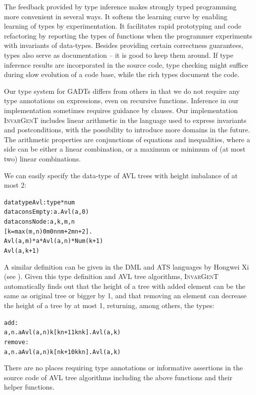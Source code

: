 \documentclass{article}
\newcommand{\tmname}[1]{\textsc{#1}}
\newcommand{\tmverbatim}[1]{{\ttfamily{#1}}}
\newenvironment{tmcode}[1][]{\begin{alltt}}{\end{alltt}}
\begin{document}
The feedback provided by type inference makes strongly typed programming more
convenient in several ways. It softens the learning curve by enabling learning
of types by experimentation. It facilitates rapid prototyping and code
refactoring by reporting the types of functions when the programmer
experiments with invariants of data-types. Besides providing certain
correctness guarantees, types also serve as documentation -- it is good to
keep them around. If type inference results are incorporated in the source
code, type checking might suffice during slow evolution of a code base, while
the rich types document the code.

Our type system for GADTs differs from others in that we do not require any
type annotations on expressions, even on recursive functions. Inference in our
implementation sometimes requires guidance by \tmverbatim{assert} clauses. Our
implementation {\tmname{InvarGenT}} includes linear arithmetic in the language
used to express invariants and postconditions, with the possibility to
introduce more domains in the future. The arithmetic properties are
conjunctions of equations and inequalities, where a side can be either a
linear combination, or a maximum or minimum of (at most two) linear
combinations.

\begin{example}
  We can easily specify the data-type of AVL trees with height imbalance of at
  most 2:
  \begin{tmcode}
  datatype Avl : type * num
datacons Empty : a. Avl (a, 0)
datacons Node : a,k,m,n
  [k=max(m,n)  0m  0n  nm+2  mn+2].
     Avl (a, m) * a * Avl (a, n) * Num (k+1)
      Avl (a, k+1)
  \end{tmcode}
  A similar definition can be given in the DML and ATS languages by Hongwei Xi
  (see {\cite{DML99}}). Given this type definition and AVL tree algorithms,
  {\tmname{InvarGenT}} automatically finds out that the height of a tree with
  added element can be the same as original tree or bigger by 1, and that
  removing an element can decrease the height of a tree by at most 1,
  returning, among others, the types:
  \begin{tmcode}
  add :
  a,n.aAvl(a, n)k[kn+1  1k  nk].Avl(a, k)
remove :
  a,n.aAvl(a, n)k[nk+1  0k  kn].Avl(a, k)
  \end{tmcode}
  There are no places requiring type annotations or informative assertions in
  the source code of AVL tree algorithms including the above functions and
  their helper functions.
\end{example}
\end{document}
